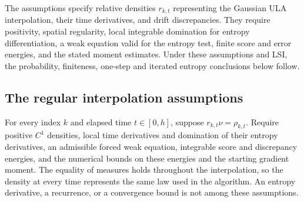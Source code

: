 \documentclass[11pt,a4paper]{report}
\begin{document}
The assumptions specify relative densities \(r_{k,t}\) representing the Gaussian ULA interpolation, their time derivatives, and drift discrepancies. They require positivity, spatial regularity, local integrable domination for entropy differentiation, a weak equation valid for the entropy test, finite score and error energies, and the stated moment estimates. Under these assumptions and LSI, the probability, finiteness, one-step and iterated entropy conclusions below follow.

\subsection{\texorpdfstring{The regular interpolation assumptions}{The regular interpolation assumptions}}
\label{report-step-UnadjustedLangevin-LSI-InterpolationData-lean-1}


For every index \(k\) and elapsed time \(t\in[0,h]\), suppose \(r_{k,t}\nu=\rho_{k,t}\). Require positive \(C^1\) densities, local time derivatives and domination of their entropy derivatives, an admissible forced weak equation, integrable score and discrepancy energies, and the numerical bounds on these energies and the starting gradient moment. The equality of measures holds throughout the interpolation, so the density at every time represents the same law used in the algorithm. An entropy derivative, a recurrence, or a convergence bound is not among these assumptions.
\end{document}
